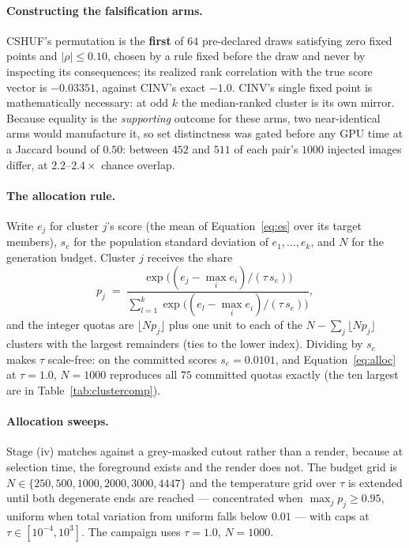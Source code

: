 \documentclass{article}
\newcommand{\atemp}{\tau}
\begin{document}
\paragraph{Constructing the falsification arms.} CSHUF's permutation is the \textbf{first} of $64$
pre-declared draws satisfying zero fixed points and $|\rho| \leq 0.10$, chosen by a rule fixed
before the draw and never by inspecting its consequences; its realized rank correlation with the
true score vector is $-0.03351$, against CINV's exact $-1.0$. CINV's single fixed point is
mathematically necessary: at odd $k$ the median-ranked cluster is its own mirror. Because equality
is the \emph{supporting} outcome for these arms, two near-identical arms would manufacture it, so
set distinctness was gated before any GPU time at a Jaccard bound of $0.50$: between $452$ and $511$
of each pair's $1000$ injected images differ, at $2.2$--$2.4\times$ chance overlap.

\paragraph{The allocation rule.} Write $e_j$ for cluster $j$'s score (the mean of Equation~\ref{eq:es}
over its target members), $s_e$ for the population standard deviation of $e_1, \dots, e_k$, and $N$
for the generation budget. Cluster $j$ receives the share
\begin{equation}
p_j \;=\; \frac{\exp\!\big((e_j - \max_i e_i)/(\atemp\, s_e)\big)}{\sum_{l=1}^{k} \exp\!\big((e_l - \max_i e_i)/(\atemp\, s_e)\big)},
\label{eq:alloc}
\end{equation}
and the integer quotas are $\lfloor N p_j \rfloor$ plus one unit to each of the $N - \sum_j \lfloor N p_j \rfloor$
clusters with the largest remainders (ties to the lower index). Dividing by $s_e$ makes $\atemp$
scale-free: on the committed scores $s_e = 0.0101$, and Equation~\ref{eq:alloc} at $\atemp = 1.0$,
$N = 1000$ reproduces all $75$ committed quotas exactly (the ten largest are in
Table~\ref{tab:clustercomp}).

\paragraph{Allocation sweeps.} Stage (iv) matches against a grey-masked cutout rather than a render,
because at selection time, the foreground exists and the render does not. The budget grid is
$N \in \{250, 500, 1000, 2000, 3000, 4447\}$ and the temperature grid over $\atemp$ is extended
until both degenerate ends are reached --- concentrated when $\max_j p_j \geq 0.95$, uniform when
total variation from uniform falls below $0.01$ --- with caps at $\atemp \in [10^{-4}, 10^{3}]$. The
campaign uses $\atemp = 1.0$, $N = 1000$.
\end{document}
